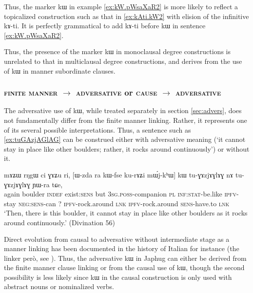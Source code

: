 \documentclass[oldfontcommands,oneside,a4paper,11pt]{article}
\newcommand{\ipa}[1]{{\phon #1}} %
\begin{document}
Thus, the marker \ipa{kɯ} in example \ref{ex:kW.pWsaXaR2}  is more likely to reflect a topicalized construction such as that in \ref{ex:kAti.kW2}  with elision of the infinitive \ipa{kɤ-ti}. It is perfectly grammatical to add \ipa{kɤ-ti} before \ipa{kɯ} in sentence \ref{ex:kW.pWsaXaR2}. 

Thus, the presence of the marker \ipa{kɯ} in monoclausal degree constructions is unrelated to that in multiclausal degree constructions, and derives from the use of \ipa{kɯ} in manner subordinate clauses. 


 \subsubsection{\textsc{finite manner} $\rightarrow$ \textsc{adversative} or \textsc{cause} $\rightarrow$ \textsc{adversative} }
 
The adversative use of \ipa{kɯ}, while treated separately  in section \ref{sec:advers}, does not fundamentally  differ from the finite manner linking. Rather, it represents one of its several possible interpretations. Thus, a sentence such as  \ref{ex:tuGAzjAGlAG} can be construed either with adversative meaning (`it cannot stay in place like other boulders; rather, it rocks around continuously') or without it.
 
 \begin{exe}
\ex \label{ex:tuGAzjAGlAG}
\gll  
    \ipa{mɤʑɯ}  	\ipa{rŋgɯ}  	\ipa{ci}  	\ipa{ɣɤʑu}  	\ipa{ri,}  	[\ipa{ɯ-zda}  	\ipa{ra}  	\ipa{kɯ-fse}  	\ipa{ku-rɤʑi}  	\ipa{mɯ́j-kʰɯ}]  	\ipa{kɯ}  	\ipa{tu-ɣɤzjɤɣlɤɣ}  	\ipa{nɤ}  	\ipa{tu-ɣɤzjɤɣlɤɣ}  	\ipa{ɲɯ-ra}  	\ipa{tɕe,}  \\
    again boulder \textsc{indef} exist:\textsc{sens} but \textsc{3sg.poss}-companion \textsc{pl} \textsc{inf:stat}-be.like \textsc{ipfv}-stay \textsc{neg:sens}-can ?{ } \textsc{ipfv}-rock.around \textsc{lnk} \textsc{ipfv}-rock.around  \textsc{sens}-have.to \textsc{lnk}     \\
   \glt `Then, there is this boulder, it cannot stay in place like other boulders as it rocks around continuously.' (Divination  56)
 \end{exe}
 
Direct evolution from causal to adversative without intermediate stage as a manner linking has been documented in the history of Italian for instance (the linker \ipa{però}, see  \citealt{mauri12adversative}). Thus, 
the adversative \ipa{kɯ} in Japhug can either be derived from the finite manner clause linking or from the causal use of  \ipa{kɯ}, though the second possibility is less likely since \ipa{kɯ} in the causal construction is only used with abstract nouns or nominalized verbs.
 
\end{document}
